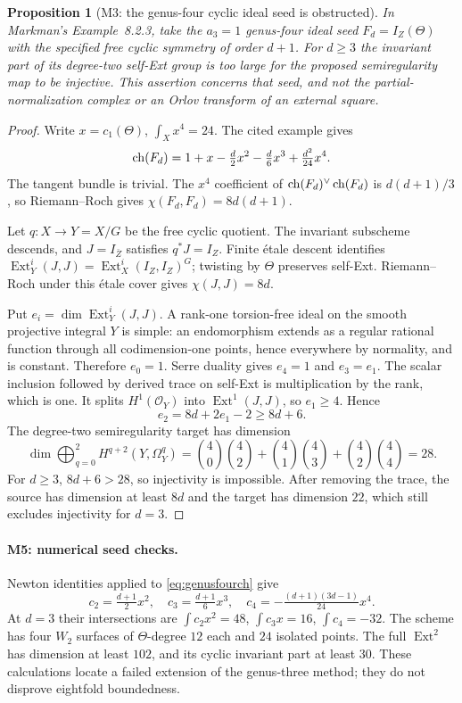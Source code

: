 \documentclass[11pt,a4paper]{article}
\newtheorem{proposition}[theorem]{Proposition}
\theoremstyle{definition}\newtheorem{definition}[theorem]{Definition}
\theoremstyle{remark}\newtheorem{remark}[theorem]{Remark}
\newcommand{\cO}{\mathcal O}\newcommand{\CH}{\operatorname{CH}}\newcommand{\cl}{\operatorname{cl}}
\newcommand{\Ext}{\operatorname{Ext}}\newcommand{\Nm}{\operatorname{Nm}}\newcommand{\SU}{\operatorname{SU}}
\begin{document}
\begin{proposition}[M3: the genus-four cyclic ideal seed is obstructed]\label{M3}
In Markman's Example~8.2.3, take the $a_3=1$ genus-four ideal seed $F_d=I_Z(\Theta)$ with the specified free cyclic symmetry of order $d+1$. For $d\ge3$ the invariant part of its degree-two self-Ext group is too large for the proposed semiregularity map to be injective. This assertion concerns that seed, and not the partial-normalization complex or an Orlov transform of an external square.
\end{proposition}
\begin{proof}
Write $x=c_1(\Theta)$, $\int_Xx^4=24$. The cited example gives
\begin{equation}\label{eq:genusfourch}
 \operatorname{ch}(F_d)=1+x-\tfrac d2x^2-\tfrac d6x^3+\tfrac{d^2}{24}x^4.
\end{equation}
The tangent bundle is trivial. The $x^4$ coefficient of $\operatorname{ch}(F_d)^\vee\operatorname{ch}(F_d)$ is $d(d+1)/3$, so Riemann--Roch gives $\chi(F_d,F_d)=8d(d+1)$.

Let $q:X\to Y=X/G$ be the free cyclic quotient. The invariant subscheme descends, and $J=I_{\bar Z}$ satisfies $q^*J=I_Z$. Finite \'{e}tale descent identifies
$\Ext^i_Y(J,J)=\Ext^i_X(I_Z,I_Z)^G$; twisting by $\Theta$ preserves self-Ext. Riemann--Roch under this \'{e}tale cover gives $\chi(J,J)=8d$.

Put $e_i=\dim\Ext^i_Y(J,J)$. A rank-one torsion-free ideal on the smooth projective integral $Y$ is simple: an endomorphism extends as a regular rational function through all codimension-one points, hence everywhere by normality, and is constant. Therefore $e_0=1$. Serre duality gives $e_4=1$ and $e_3=e_1$. The scalar inclusion followed by derived trace on self-Ext is multiplication by the rank, which is one. It splits $H^1(\cO_Y)$ into $\Ext^1(J,J)$, so $e_1\ge4$. Hence
\[
 e_2=8d+2e_1-2\ge8d+6.
\]
The degree-two semiregularity target has dimension
\[
 \dim\bigoplus_{q=0}^2H^{q+2}(Y,\Omega_Y^q)
 =\binom40\binom42+\binom41\binom43+\binom42\binom44
 =28.
\]
For $d\ge3$, $8d+6>28$, so injectivity is impossible. After removing the trace, the source has dimension at least $8d$ and the target has dimension $22$, which still excludes injectivity for $d=3$.
\end{proof}

\paragraph{M5: numerical seed checks.}
Newton identities applied to \eqref{eq:genusfourch} give
\[
 c_2=\tfrac{d+1}{2}x^2,\quad
 c_3=\tfrac{d+1}{6}x^3,\quad
 c_4=-\tfrac{(d+1)(3d-1)}{24}x^4.
\]
At $d=3$ their intersections are $\int c_2x^2=48$, $\int c_3x=16$, $\int c_4=-32$. The scheme has four $W_2$ surfaces of $\Theta$-degree $12$ each and $24$ isolated points. The full $\Ext^2$ has dimension at least $102$, and its cyclic invariant part at least $30$. These calculations locate a failed extension of the genus-three method; they do not disprove eightfold boundedness.
\end{document}

